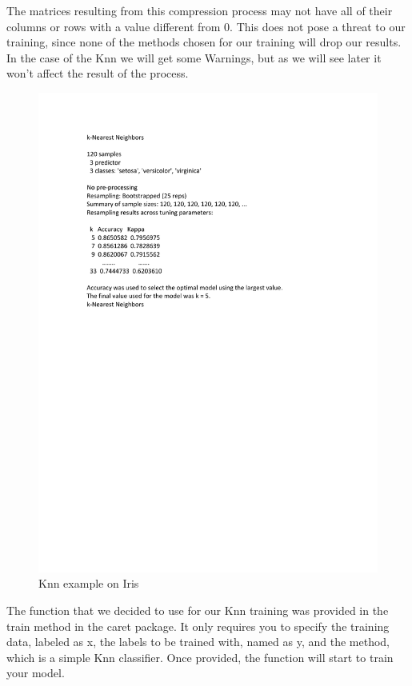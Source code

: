 The matrices resulting from this compression process may not have all of their columns or rows with a value different from 0. This does not pose a threat to our training, since none of the methods chosen for our training will drop our results. In the case of the Knn  we will get some Warnings, but as we will see later it won't affect the result of the process. \par


\begin{figure}[H]
	\centering
	\includegraphics[width=15cm]{Figuras_tfg/Knn_example}
	\caption{Knn example on Iris}
	\label{fig:figure_Knn_Iris}
\end{figure}

The function that we decided to use for our Knn training was provided in the train method in the caret package. It only requires you to specify the training data, labeled as x, the labels to be trained with, named as y, and the method, which is a simple Knn classifier. Once provided, the function will start to train your model. \par



